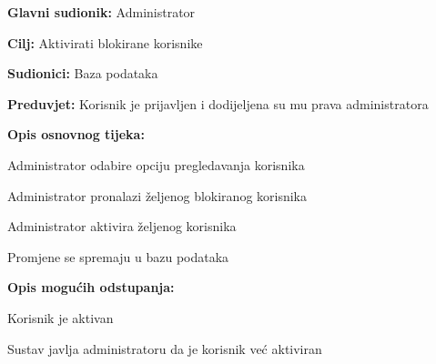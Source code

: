 				\noindent {}
					\begin{packed_item}
	
						\item \textbf{Glavni sudionik: }Administrator
						\item  \textbf{Cilj:} Aktivirati blokirane korisnike
						\item  \textbf{Sudionici:} Baza podataka
						\item  \textbf{Preduvjet:} Korisnik je prijavljen i dodijeljena su mu prava administratora
						\item  \textbf{Opis osnovnog tijeka:}
						
						\item[] \begin{packed_enum}
	
							\item Administrator odabire opciju pregledavanja korisnika
							\item Administrator pronalazi željenog blokiranog korisnika
							\item Administrator aktivira željenog korisnika
							\item Promjene se spremaju u bazu podataka

						\end{packed_enum}
						
						\item  \textbf{Opis mogućih odstupanja:}
						
						\item[] \begin{packed_item}
	
							\item[3.a] Korisnik je aktivan
								\begin{packed_item}
									\item Sustav javlja administratoru da je korisnik već aktiviran
								\end{packed_item}
							
						\end{packed_item}
					\end{packed_item}
					
